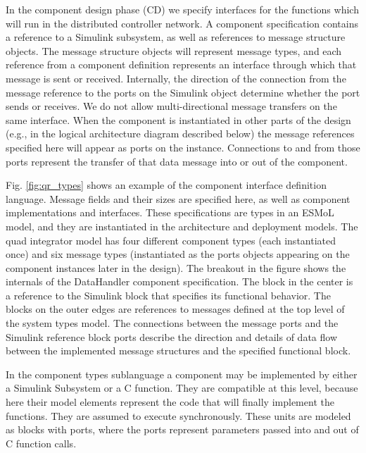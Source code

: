 In the component design phase (CD) we specify interfaces for the functions which will run in the 
distributed controller network.  A component specification contains a reference to a Simulink subsystem,
as well as references to message structure objects.  The message structure objects will represent message
types, and each reference from a component definition represents an interface through which that message
is sent or received.  Internally, the direction of the connection from the message reference to the ports
on the Simulink object determine whether the port sends or receives.  We do not allow multi-directional
message transfers on the same interface.  When the component is instantiated in other parts of the design
(e.g., in the logical architecture diagram described below) the message references specified here will 
appear as ports on the instance.  Connections to and from those ports represent the transfer of that
data message into or out of the component.

Fig. \ref{fig:qr_types} shows an example of the component interface definition 
language.  Message fields and their sizes are specified here, as well as
component implementations and interfaces.  These specifications are types in
an ESMoL model, and they are instantiated in the architecture and 
deployment models.  The quad integrator model has four
different component types (each instantiated once) and six message types
(instantiated as the ports objects appearing on the component instances later
in the design).  The breakout in the figure shows the internals of the DataHandler component
specification.  The block in the center is a reference to the Simulink block that specifies
its functional behavior.  The blocks on the outer edges are references to messages defined at
the top level of the system types model.  The connections between the message ports and the
Simulink reference block ports describe the direction and details of data flow between the 
implemented message structures and the specified functional block.

In the component types sublanguage a component may be implemented by either a Simulink Subsystem or a 
C function.  They are compatible at this level, because here their model elements represent the code that 
will finally implement the functions.  They are assumed to execute synchronously.  These units are 
modeled as blocks with ports, where the ports represent parameters passed into and out of C function calls.

